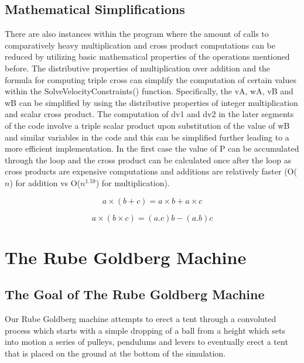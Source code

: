 \documentclass[11pt] {article}
\begin{document}
\subsection {Mathematical Simplifications}

There are also instances within the program where the amount of calls to comparatively heavy multiplication
and cross product computations can be reduced by utilizing basic mathematical properties of the operations
mentioned before. The distributive properties of multiplication over addition and the formula for computing
triple cross can simplify the computation of certain values within the SolveVelocityConstraints() function.
Specifically, the vA, wA, vB and wB can be simplified by using the distributive properties of integer
multiplication and scalar cross product. The computation of dv1 and dv2 in the later segments of the code
involve a triple scalar product upon substitution of the value of wB and similar variables in the code and
this can be simplified further leading to a more efficient implementation. In the first case the value of
P can be accumulated through the loop and the cross product can be calculated once after the loop as cross
products are expensive computations and additions are relatively faster (O($n$) for addition vs O($n^{1.59}$)
for multiplication).

\begin {equation} 
a\times(b+c) = a\times b + a \times c
\end {equation}

\begin {equation} 
a\times(b\times c) = (a.c)b - (a.b)c
\end {equation}

\newpage

\section {The Rube Goldberg Machine}

\subsection {The Goal of The Rube Goldberg Machine}

Our Rube Goldberg machine attempts to erect a tent through a convoluted process which starts with a simple dropping
of a ball from a height which sets into motion a series of pulleys, pendulums and levers to eventually erect a tent
that is placed on the ground at the bottom of the simulation. 
\end{document}
